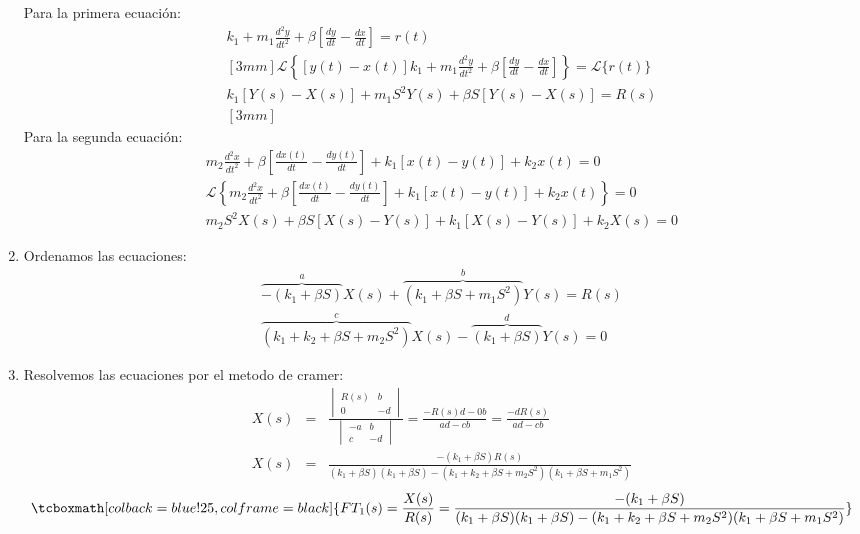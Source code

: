 \documentclass[12pt]{article}
\begin{document}
\begin{enumerate}
    Para la primera ecuaci\'on:
    \begin{eqnarray*}
      [y(t)-x(t)]k_{1} + m_{1}\frac{d^{2}y}{dt^{2}}+\beta \left[\frac{dy}{dt}-\frac{dx}{dt}\right]=r(t)\\ [3mm]
      \mathscr{L}\left\{[y(t)-x(t)]k_{1} + m_{1}\frac{d^{2}y}{dt^{2}}+\beta \left[\frac{dy}{dt}-\frac{dx}{dt}\right]\right\}=\mathscr{L}\{r(t)\}\\[3mm]
      k_{1}[Y(s)-X(s)] + m_{1}S^{2}Y(s) + \beta S[Y(s)-X(s)]=R(s)\\ [3mm]
    \end{eqnarray*}
    Para la segunda ecuaci\'on:
    \begin{eqnarray*}
      m_{2}\frac{d^{2}x}{dt^{2}} + \beta\left[\frac{dx(t)}{dt}-\frac{dy(t)}{dt}\right] + k_{1}[x(t)-y(t)] + k_{2}x(t) = 0\\[3mm]
      \mathscr{L}\left\{m_{2}\frac{d^{2}x}{dt^{2}} + \beta\left[\frac{dx(t)}{dt}-\frac{dy(t)}{dt}\right] + k_{1}[x(t)-y(t)] + k_{2}x(t)\right \} = 0\\[3mm]
      m_{2}S^{2}X(s) + \beta S[X(s)-Y(s)] + k_{1}[X(s)-Y(s)] + k_{2}X(s) = 0
    \end{eqnarray*}

  \item Ordenamos las ecuaciones:
    \begin{eqnarray}
      \overbrace{-(k_{1} + \beta S)}^{a}X(s) + \overbrace{(k_{1} + \beta S + m_{1}S^{2})}^{b}Y(s) = R(s)\\[3mm]
      \overbrace{(k_{1}+k_{2}+ \beta S + m_{2}S^{2})}^{c}X(s) - \overbrace{(k_{1} + \beta S)}^{d}Y(s) = 0
    \end{eqnarray}

  \item Resolvemos las ecuaciones por el metodo de cramer:
    \begin{eqnarray*}
      X(s)&=&\frac{
      \begin{vmatrix}
        R(s) & b\\
        0 & -d
      \end{vmatrix}}
      {\begin{vmatrix}
        -a & b\\
        c & -d
      \end{vmatrix}}
      =\frac{-R(s)d-0b}{ad-cb}=\frac{-dR(s)}{ad-cb}\\[3mm]
      X(s)&=&\frac{-(k_{1}+\beta S)R(s)}{(k_{1}+ \beta S)(k_{1}+ \beta S) - (k_{1}+k_{2} +\beta S + m_{2}S^{2})(k_{1} + \beta S + m_{1}S^{2})}
    \end{eqnarray*}
    \begin{eqnarray*}
      \tcboxmath[colback=blue!25,colframe=black]
      {FT_{1}(s)=\frac{X(s)}{R(s)}=\frac{-(k_{1}+\beta S)}{(k_{1}+ \beta S)(k_{1}+ \beta S) - (k_{1}+k_{2} +\beta S + m_{2}S^{2})(k_{1} + \beta S + m_{1}S^{2})}}
    \end{eqnarray*}


\end{enumerate}
\end{document}
